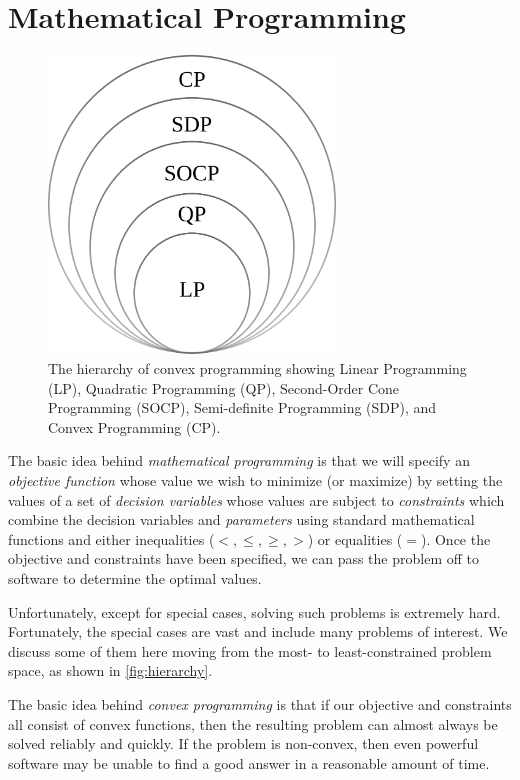 \documentclass{article}
\begin{document}
\section{Mathematical Programming}
\label{sec:mathprog}

\begin{figure}
\centering
\includegraphics[width=3in]{imgs/hierarchy-of-convex-programs.png}
\caption{The hierarchy of convex programming showing Linear Programming (LP), Quadratic Programming (QP), Second-Order Cone Programming (SOCP), Semi-definite Programming (SDP), and Convex Programming (CP). \label{fig:hierarchy}}
\end{figure}

The basic idea behind \textit{mathematical programming} is that we will specify an \textit{objective function} whose value we wish to minimize (or maximize) by setting the values of a set of \textit{decision variables} whose values are subject to \textit{constraints} which combine the decision variables and \textit{parameters} using standard mathematical functions and either inequalities ($<,\le,\ge,>$) or equalities ($=$). Once the objective and constraints have been specified, we can pass the problem off to software to determine the optimal values.

Unfortunately, except for special cases, solving such problems is extremely hard. Fortunately, the special cases are vast and include many problems of interest. We discuss some of them here moving from the most- to least-constrained problem space, as shown in \autoref{fig:hierarchy}.



The basic idea behind \textit{convex programming} is that if our objective and constraints all consist of convex functions, then the resulting problem can almost always be solved reliably and quickly. If the problem is non-convex, then even powerful software may be unable to find a good answer in a reasonable amount of time.
\end{document}
